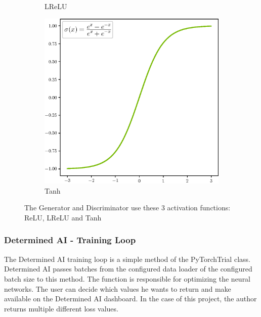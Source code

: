 \begin{figure}[H]
\begin{subfigure}[b]{0.3\textwidth}
        \caption{LReLU\footnotemark}
        \label{fig:lrelu}
    \end{subfigure}
    \hfill
    \begin{subfigure}[b]{0.3\textwidth}
        \centering
        \includegraphics[width=\textwidth]{resources/images/Tanh.eps}
        \caption{Tanh\footnotemark}
        \label{fig:tanh}
    \end{subfigure}
    \caption{The Generator and Discriminator use these 3 activation functions: ReLU, LReLU and Tanh}
    \label{fig:activation_functions}
\end{figure}




\newpage


\subsubsection{Determined AI - Training Loop}

The Determined AI training loop is a simple method of the PyTorchTrial class. Determined AI passes batches from the configured data loader of the configured batch size to this method. The function is responsible for optimizing the neural networks. The user can decide which values he wants to return and make available on the Determined AI dashboard. In the case of this project, the author returns multiple different loss values. \\

